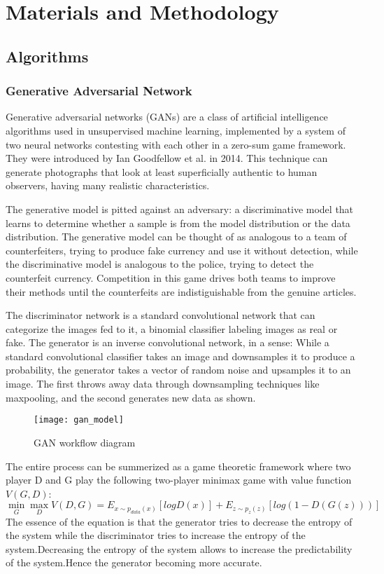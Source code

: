 \chapter{Materials and Methodology}
\section{Algorithms}
\subsection{Generative Adversarial Network}
Generative adversarial networks (GANs) are a class of artificial intelligence algorithms used in unsupervised machine learning, implemented by a system of two neural networks contesting with each other in a zero-sum game framework. They were introduced by Ian Goodfellow et al. in 2014. This technique can generate photographs that look at least superficially authentic to human observers, having many realistic characteristics.

The generative model is pitted against an adversary: a
discriminative model that learns to determine whether a sample is from the model distribution or the
data distribution. The generative model can be thought of as analogous to a team of counterfeiters,
trying to produce fake currency and use it without detection, while the discriminative model is
analogous to the police, trying to detect the counterfeit currency. Competition in this game drives
both teams to improve their methods until the counterfeits are indistiguishable from the genuine
articles.

The discriminator network is a standard convolutional network that can categorize the images fed to it, a binomial classifier labeling images as real or fake. The generator is an inverse convolutional network, in a sense: While a standard convolutional classifier takes an image and downsamples it to produce a probability, the generator takes a vector of random noise and upsamples it to an image. The first throws away data through downsampling techniques like maxpooling, and the second generates new data as shown.


\begin{figure}
 \centering
 \texttt{[image: gan\_model]}
 \caption{GAN workflow diagram}
 \label{fig:ganmodel}
\end{figure}

The entire process can be summerized as a game theoretic framework where two player D and G play the following two-player minimax game with value function $V(G,D)$:
\begin{equation}
\min_{G}\max_{D}V(D,G) = E_{x\sim p_{data}(x)}[log D(x)] + E_{z\sim p_z(z)}[log( 1 - D(G(z)))] 
\end{equation}
The essence of the equation is that the generator tries to decrease the entropy of the system while the discriminator  tries to increase the entropy of the system.Decreasing the entropy of the system allows to increase the predictability of the system.Hence the generator becoming more accurate.

